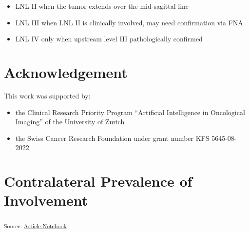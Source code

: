 \documentclass[
  sn-mathphys-num,
]{sn-jnl}
\providecommand{\tightlist}{%
  \setlength{\itemsep}{0pt}\setlength{\parskip}{0pt}}\usepackage{longtable,booktabs,array}
\begin{document}
\begin{itemize}
\tightlist
\item
  LNL II when the tumor extends over the mid-sagittal line
\item
  LNL III when LNL II is clinically involved, may need confirmation via
  FNA
\item
  LNL IV only when upstream level III pathologically confirmed
\end{itemize}

\section{Acknowledgement}\label{acknowledgement}

This work was supported by:

\begin{itemize}
\tightlist
\item
  the Clinical Research Priority Program ``Artificial Intelligence in
  Oncological Imaging'' of the University of Zurich
\item
  the Swiss Cancer Research Foundation under grant number KFS
  5645-08-2022
\end{itemize}

\section{Contralateral Prevalence of
Involvement}\label{contralateral-prevalence-of-involvement}

\textsubscript{Source:
\href{https://rmnldwg.github.io/bilateral-paper/manuscript-preview.html}{Article
Notebook}}
\end{document}
